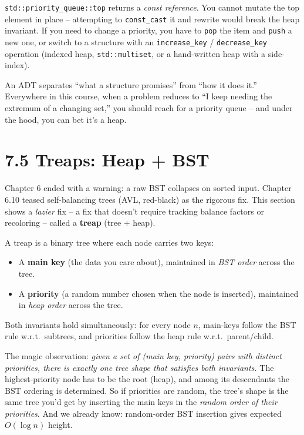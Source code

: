 \documentclass[11pt]{article}
\begin{document}
\begin{warnbox}
\texttt{std::priority\_queue::top} returns a \emph{const reference}. You cannot mutate the top element in place -- attempting to \texttt{const\_cast} it and rewrite would break the heap invariant. If you need to change a priority, you have to \texttt{pop} the item and \texttt{push} a new one, or switch to a structure with an \texttt{increase\_key} / \texttt{decrease\_key} operation (indexed heap, \texttt{std::multiset}, or a hand-written heap with a side-index).
\end{warnbox}

\begin{ideabox}
An ADT separates ``what a structure promises'' from ``how it does it.'' Everywhere in this course, when a problem reduces to ``I keep needing the extremum of a changing set,'' you should reach for a priority queue -- and under the hood, you can bet it's a heap.
\end{ideabox}

\section{7.5 Treaps: Heap + BST}

Chapter 6 ended with a warning: a raw BST collapses on sorted input. Chapter 6.10 teased self-balancing trees (AVL, red-black) as the rigorous fix. This section shows a \emph{lazier} fix -- a fix that doesn't require tracking balance factors or recoloring -- called a \textbf{treap} (tree + heap).

\begin{defnbox}[Treap]
A treap is a binary tree where each node carries two keys:
\begin{itemize}[leftmargin=*]
    \item A \textbf{main key} (the data you care about), maintained in \emph{BST order} across the tree.
    \item A \textbf{priority} (a random number chosen when the node is inserted), maintained in \emph{heap order} across the tree.
\end{itemize}
Both invariants hold simultaneously: for every node $n$, main-keys follow the BST rule w.r.t.\ subtrees, and priorities follow the heap rule w.r.t.\ parent/child.
\end{defnbox}

The magic observation: \emph{given a set of (main key, priority) pairs with distinct priorities, there is exactly one tree shape that satisfies both invariants.} The highest-priority node has to be the root (heap), and among its descendants the BST ordering is determined. So if priorities are random, the tree's shape is the same tree you'd get by inserting the main keys in the \emph{random order of their priorities}. And we already know: random-order BST insertion gives expected $O(\log n)$ height.
\end{document}
